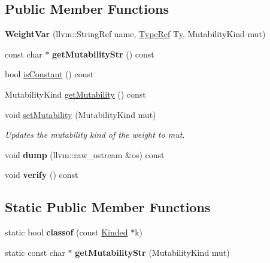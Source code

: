\subsection*{Public Member Functions}
\begin{DoxyCompactItemize}
\item 
\mbox{\label{classglow_1_1_weight_var_a8d1d4085945fa8851839e7511a4b6637}} 
{\bfseries Weight\+Var} (llvm\+::\+String\+Ref name, \hyperlink{structglow_1_1_type}{Type\+Ref} Ty, Mutability\+Kind mut)
\item 
\mbox{\label{classglow_1_1_weight_var_ab0b3b1e99a3d79df45a6418ebeab8b28}} 
const char $\ast$ {\bfseries get\+Mutability\+Str} () const
\item 
bool \hyperlink{classglow_1_1_weight_var_a7b6e1db89415271742303e738217e858}{is\+Constant} () const
\item 
Mutability\+Kind \hyperlink{classglow_1_1_weight_var_a1041b9e284dc6297d660d41d426da66e}{get\+Mutability} () const
\item 
\mbox{\label{classglow_1_1_weight_var_a6f13c056c8522a704f3e4e88d763d1f6}} 
void \hyperlink{classglow_1_1_weight_var_a6f13c056c8522a704f3e4e88d763d1f6}{set\+Mutability} (Mutability\+Kind mut)
\begin{DoxyCompactList}\small\item\em Updates the mutability kind of the weight to {\ttfamily mut}. \end{DoxyCompactList}\item 
\mbox{\label{classglow_1_1_weight_var_a44ad7042028fc3d3dc129dfab28b88b7}} 
void {\bfseries dump} (llvm\+::raw\+\_\+ostream \&os) const
\item 
\mbox{\label{classglow_1_1_weight_var_a27af35c8dabe1259e91c95a16695dfa3}} 
void {\bfseries verify} () const
\end{DoxyCompactItemize}
\subsection*{Static Public Member Functions}
\begin{DoxyCompactItemize}
\item 
\mbox{\label{classglow_1_1_weight_var_a119e48a2d384f6a116ed29921cad0ffa}} 
static bool {\bfseries classof} (const \hyperlink{classglow_1_1_kinded}{Kinded} $\ast$k)
\item 
\mbox{\label{classglow_1_1_weight_var_aa851926bc54aaa4b9b7f391015af0399}} 
static const char $\ast$ {\bfseries get\+Mutability\+Str} (Mutability\+Kind mut)
\end{DoxyCompactItemize}


